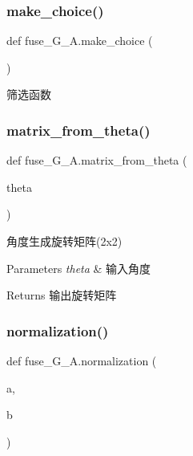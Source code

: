 \subsubsection{\texorpdfstring{make\+\_\+choice()}{make\_choice()}}
{\footnotesize\ttfamily def fuse\+\_\+\+G\+\_\+\+A.\+make\+\_\+choice (\begin{DoxyParamCaption}{ }\end{DoxyParamCaption})}



筛选函数 

\mbox{\label{namespacefuse___g___a_a74f80657b382fa053abcca4f446c4036}} 
\subsubsection{\texorpdfstring{matrix\+\_\+from\+\_\+theta()}{matrix\_from\_theta()}}
{\footnotesize\ttfamily def fuse\+\_\+\+G\+\_\+\+A.\+matrix\+\_\+from\+\_\+theta (\begin{DoxyParamCaption}\item[{}]{theta }\end{DoxyParamCaption})}



角度生成旋转矩阵(2x2) 


\begin{DoxyParams}{Parameters}
{\em theta} & 输入角度\\
\hline
\end{DoxyParams}
\begin{DoxyReturn}{Returns}
输出旋转矩阵 
\end{DoxyReturn}
\mbox{\label{namespacefuse___g___a_add9a25d710f1565c5ea9d8706824422b}} 
\subsubsection{\texorpdfstring{normalization()}{normalization()}}
{\footnotesize\ttfamily def fuse\+\_\+\+G\+\_\+\+A.\+normalization (\begin{DoxyParamCaption}\item[{}]{a,  }\item[{}]{b }\end{DoxyParamCaption})}



